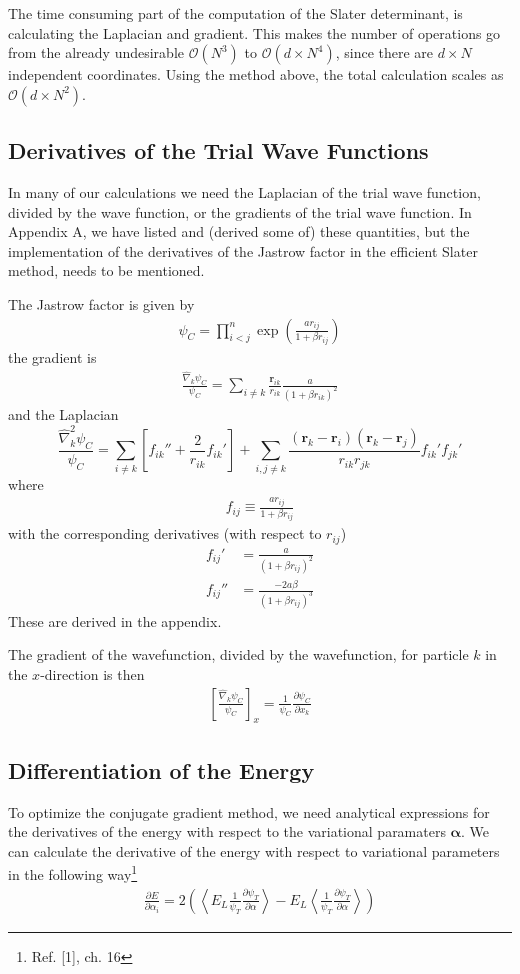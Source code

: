 \documentclass[twocolumns, a4paper,10pt,fleqn]{extarticle}
\newcommand{\eq}[1]{{\small\begin{align*}#1\end{align*}}}
\newcommand{\equ}[1]{{\small\begin{align}#1\end{align}}}
\renewcommand\vec[1]{\boldsymbol{\mathbf{#1}}}
\newcommand{\op}[1]{\hat{#1}}
\begin{document}
The time consuming part of the computation of the Slater determinant,
is calculating the Laplacian and gradient. This makes the
number of operations go from the already undesirable $\mathcal O(N^3)$ to
$\mathcal O(d\times N^4)$, since there are $d\times N$ independent coordinates.
Using the method above, the total calculation scales as
$\mathcal O(d\times N^2)$.


\subsection{Derivatives of the Trial Wave Functions}
In many of our calculations we need the Laplacian of the trial wave function,
divided by the wave function, or the gradients of the trial wave function.
In Appendix A, we have listed and (derived some of) these quantities,
but the implementation of the derivatives of
the Jastrow factor in the efficient Slater method, needs to be mentioned.

The Jastrow factor is given by
\equ{
  \psi_C = \prod_{i<j}^{n}\exp{\left(\frac{a r_{ij}}{1+\beta r_{ij}}\right)}
  \label{eq:psicor}
}
the gradient is
\eq{
  \frac{\op\nabla_k\psi_C}{\psi_C} =\sum_{i\neq k}\frac{\vec r_{ik}}{r_{ik}}\frac{a}{(1+\beta r_{ik})^2} 
}
and the Laplacian
{\tiny\begin{equation*}
  \frac{\op\nabla_k^2 \psi_C}{\psi_C}
    =\sum_{i\neq k}
    \left[f_{ik}''+ \frac{2}{r_{ik}}f_{ik}'\right]
    +
    \sum_{i,j\neq k}\frac{(\vec r_k-\vec r_i)(\vec r_k-\vec r_j)}{r_{ik} r_{jk}} 
    f_{ik}' f_{jk}'
\end{equation*}}%
where
\eq{
  f_{ij} \equiv \frac{ar_{ij}}{1+\beta r_{ij}}
}
with the corresponding derivatives (with respect to $r_{ij}$)
\eq{
  f_{ij}' &= \frac{a}{(1+\beta r_{ij})^2}\\
  f_{ij}'' &= \frac{-2a\beta}{(1+\beta r_{ij})^3}
}
These are derived in the appendix.

The gradient of the wavefunction, 
divided by the wavefunction, for particle $k$ in the $x$-direction is then
\eq{
  \left[\frac{\op\nabla_k\psi_C}{\psi_C}\right]_x 
  =\frac{1}{\psi_C}\frac{\partial\psi_C}{\partial x_k}
}

\subsection{Differentiation of the Energy}

To optimize the conjugate gradient method, we need analytical expressions
for the derivatives of the energy with respect to the variational paramaters
$\vec \alpha$.
We can calculate the derivative of the energy with respect
to variational parameters in the following way\footnote{Ref. [1], ch. 16}
\equ{
  \frac{\partial E}{\partial \alpha_i} =
  2 \left(
  \left\langle  
  E_L\frac{1}{\psi_T}\frac{\partial \psi_T}{\partial \alpha}
  \right\rangle
  - E_L \left\langle  
  \frac{1}{\psi_T}\frac{\partial \psi_T}{\partial \alpha}
  \right\rangle
  \right)\label{eq:Eder}
}
\end{document}
